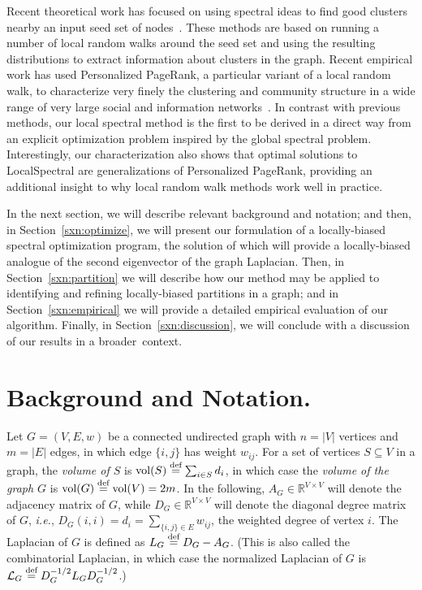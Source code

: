 \documentclass[11pt]{article}
\newcommand{\defeq}{\stackrel{\textup{def}}{=}}
\newcommand{\vol}{\mathrm{vol}}
\begin{document}
Recent theoretical work has focused on using spectral ideas to find good 
clusters nearby an input seed set of 
nodes~\cite{Spielman:2004,andersen06local,chung07_fourproofs}. 
These methods are based on running a number of local random walks around the 
seed set and using the resulting distributions to extract information about 
clusters in the graph.
Recent empirical work has used Personalized PageRank, a particular variant 
of a local random walk, to characterize very finely the clustering and 
community structure in a wide range of very large social and information 
networks~\cite{andersen06seed,LLDM08_communities_CONF,LLDM09_communities_IM,LLM10_communities_CONF}. 
In contrast with previous methods, our local spectral method is the first to 
be derived in a direct way from an explicit optimization problem inspired 
by the global spectral problem.  
Interestingly, our characterization also shows that optimal solutions to 
\textsf{LocalSpectral} are  generalizations of Personalized PageRank, 
providing an additional insight to why local random walk methods work well 
in practice.

In the next section, we will describe relevant background and notation; and 
then, in Section~\ref{sxn:optimize}, we will present our formulation of a 
locally-biased spectral optimization program, the solution of which will 
provide a locally-biased analogue of the second eigenvector of the graph 
Laplacian. 
Then, in Section~\ref{sxn:partition} we will describe how our method may be 
applied to identifying and refining locally-biased partitions in a graph; and
in Section~\ref{sxn:empirical} we will provide a detailed empirical 
evaluation of our algorithm.
Finally, in Section~\ref{sxn:discussion}, we will conclude with a discussion 
of our results in a broader~context.



\section{Background and Notation.} 
\label{sxn:background}

Let $G=(V,E,w)$ be a connected undirected graph with $n=|V|$ vertices and 
$m=|E|$ edges, in which edge $\{i,j\}$ has weight $w_{ij}.$
For a set of vertices $S \subseteq V$ in a graph, the \emph{volume of $S$} 
is $\vol(S) \defeq \sum_{i \in S}d_i$, in which case the \emph{volume of the
graph $G$} is $\vol(G) \defeq \vol(V)=2m$. 
In the following, $A_G \in \mathbb{R}^{V \times V}$ will denote the 
adjacency matrix of $G$, while $D_G \in \mathbb{R}^{V \times V}$ will denote 
the diagonal degree matrix of $G$, \emph{i.e.},  
$D_G(i,i)=d_i = \sum_{\{i,j\} \in E} w_{ij}$, the weighted degree of vertex $i$.
The Laplacian of $G$ is defined as $L_G \defeq D_G-A_G$. 
(This is also called the combinatorial Laplacian, in which case the
normalized Laplacian of $G$ is $\mathcal{L}_G\defeq D_G^{-1/2}L_GD_G^{-1/2}$.)
\end{document}
